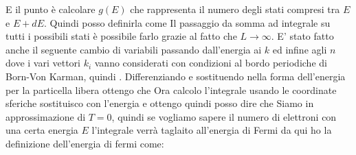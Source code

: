 \documentclass[a4paper,12pt]{article}
\begin{document}
E il punto è calcolare $g(E)$ che rappresenta il numero degli stati compresi tra $E$ e $E+dE$. Quindi posso definirla come
Il passaggio da somma ad integrale su tutti i possibili stati è possibile farlo grazie al fatto che $L\to\infty$.
E' stato fatto anche il seguente cambio di variabili passando dall'energia ai $k$ ed infine agli $n$
dove i vari vettori $k_i$ vanno considerati con condizioni al bordo periodiche di Born-Von Karman, quindi 
.
Differenziando e sostituendo nella forma dell'energia per la particella libera ottengo che
Ora calcolo l'integrale usando le coordinate sferiche
sostituisco con l'energia e ottengo
quindi posso dire che
Siamo in approssimazione di $T=0$, quindi se vogliamo sapere il numero di elettroni con una certa energia $E$ l'integrale verrà taglaito all'energia di Fermi
da qui ho la definizione dell'energia di fermi come:
\end{document}
